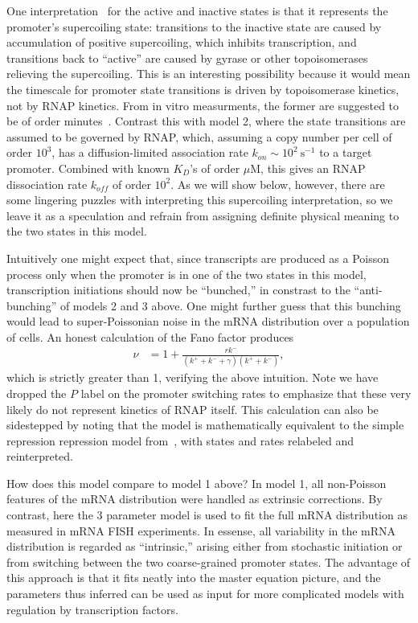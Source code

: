 One interpretation~\cite{Chong2014, Sevier2016} for the active and inactive
states is that it represents the promoter's supercoiling state: transitions to
the inactive state are caused by accumulation of positive supercoiling, which
inhibits transcription, and transitions back to ``active'' are caused by gyrase
or other topoisomerases relieving the supercoiling. This is an interesting
possibility because it would mean the timescale for promoter state transitions
is driven by topoisomerase kinetics, not by RNAP kinetics. From in vitro
measurments, the former are suggested to be of order minutes~\cite{Chong2014}.
Contrast this with model 2, where the state transitions are assumed to be
governed by RNAP, which, assuming a copy number per cell of order $10^3$, has a
diffusion-limited association rate $k_{on} \sim 10^2~\text{s}^{-1}$ to a target
promoter. Combined with known $K_D$'s of order $\mu$M, this gives an RNAP
dissociation rate $k_{off}$ of order $10^2$. As we will show below, however,
there are some lingering puzzles with interpreting this supercoiling
interpretation, so we leave it as a speculation and refrain from assigning
definite physical meaning to the two states in this model.

Intuitively one might expect that, since transcripts are produced as a Poisson
process only when the promoter is in one of the two states in this model,
transcription initiations should now be ``bunched,'' in constrast to the
``anti-bunching'' of models 2 and 3 above. One might further guess that this
bunching would lead to super-Poissonian noise in the mRNA distribution over a
population of cells. An honest calculation of the Fano factor produces
\begin{align}
\nu &= 1 + \frac{r k^-}{(k^+ + k^- + \gamma)(k^+ + k^-)},
\end{align}
which is strictly greater than 1, verifying the above intuition. Note we have
dropped the $P$ label on the promoter switching rates to emphasize that these
very likely do not represent kinetics of RNAP itself. This calculation can also
be sidestepped by noting that the model is mathematically equivalent to the
simple repression repression model from~\cite{Jones2014}, with states and rates
relabeled and reinterpreted.

How does this model compare to model 1 above? In model 1, all non-Poisson
features of the mRNA distribution were handled as extrinsic corrections. By
contrast, here the 3 parameter model is used to fit the full mRNA distribution
as measured in mRNA FISH experiments. In essense, all variability in the mRNA
distribution is regarded as ``intrinsic,'' arising either from stochastic
initiation or from switching between the two coarse-grained promoter states. The
advantage of this approach is that it fits neatly into the master equation
picture, and the parameters thus inferred can be used as input for more
complicated models with regulation by transcription factors.

